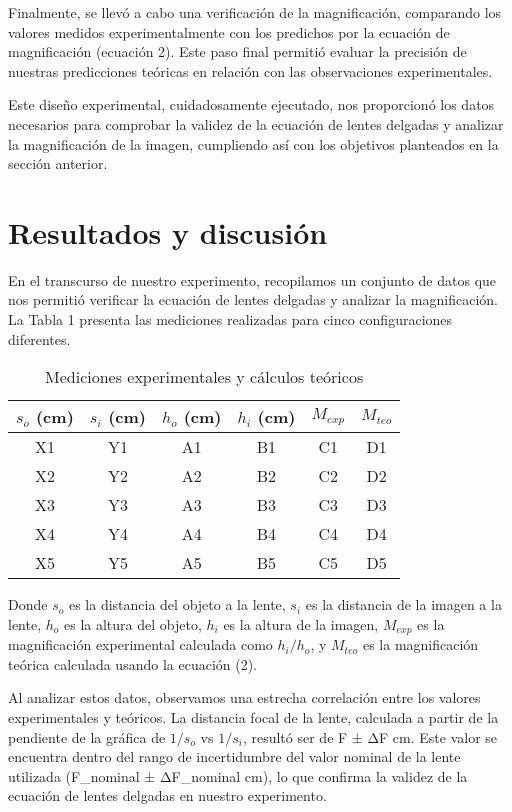 \documentclass[twocolumn,a4paper,11pt]{scrartcl}
\begin{document}
Finalmente, se llevó a cabo una verificación de la magnificación, comparando los valores medidos experimentalmente con los predichos por la ecuación de magnificación (ecuación 2). Este paso final permitió evaluar la precisión de nuestras predicciones teóricas en relación con las observaciones experimentales.

Este diseño experimental, cuidadosamente ejecutado, nos proporcionó los datos necesarios para comprobar la validez de la ecuación de lentes delgadas y analizar la magnificación de la imagen, cumpliendo así con los objetivos planteados en la sección anterior.

\section{Resultados y discusión}

En el transcurso de nuestro experimento, recopilamos un conjunto de datos que nos permitió verificar la ecuación de lentes delgadas y analizar la magnificación. La Tabla 1 presenta las mediciones realizadas para cinco configuraciones diferentes.

\begin{table}[h]
\centering
\caption{Mediciones experimentales y cálculos teóricos}
\label{tab:mediciones}
\begin{tabular}{|c|c|c|c|c|c|}
\hline
$s_o$ (cm) & $s_i$ (cm) & $h_o$ (cm) & $h_i$ (cm) & $M_{exp}$ & $M_{teo}$ \\
\hline
X1 & Y1 & A1 & B1 & C1 & D1 \\
X2 & Y2 & A2 & B2 & C2 & D2 \\
X3 & Y3 & A3 & B3 & C3 & D3 \\
X4 & Y4 & A4 & B4 & C4 & D4 \\
X5 & Y5 & A5 & B5 & C5 & D5 \\
\hline
\end{tabular}
\end{table}

Donde $s_o$ es la distancia del objeto a la lente, $s_i$ es la distancia de la imagen a la lente, $h_o$ es la altura del objeto, $h_i$ es la altura de la imagen, $M_{exp}$ es la magnificación experimental calculada como $h_i/h_o$, y $M_{teo}$ es la magnificación teórica calculada usando la ecuación (2).

Al analizar estos datos, observamos una estrecha correlación entre los valores experimentales y teóricos. La distancia focal de la lente, calculada a partir de la pendiente de la gráfica de $1/s_o$ vs $1/s_i$, resultó ser de F ± ΔF cm. Este valor se encuentra dentro del rango de incertidumbre del valor nominal de la lente utilizada (F_nominal ± ΔF_nominal cm), lo que confirma la validez de la ecuación de lentes delgadas en nuestro experimento.
\end{document}
